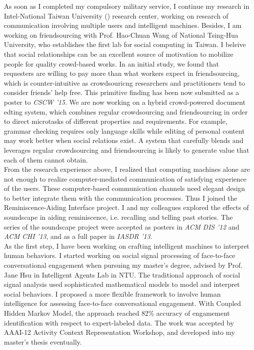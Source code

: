 \noindent
As soon as I completed my compulsory military service, 
I continue my research in Intel-National Taiwan University () research center, 
working on research of communication involving multiple users and intelligent machines. 
Besides, I am working on friendsourcing with Prof. Hao-Chuan Wang of National Tsing-Hua University, 
who establishes the first lab for social computing in Taiwan. 
I beleive that social relationships can be an excellent source of motivation to mobilize people for quality crowd-based works. 
In an initial study, we found that requesters are willing to pay more than what workers expect in friendsourcing, 
which is counter-intuitive as crowdsouricng researchers and practitioners tend to consider friends' help free. 
This primitive finding has been now submitted as a poster to \emph{CSCW '15}. 
We are now working on a hybrid crowd-powered document edting system, 
which combines regular crowdsourcing and friendsourcing in order to direct microtasks of different properties and requirements. 
For example, grammar checking requires only language skills while editing of personal content may work better when social relations exist. 
A system that carefully blends and leverages regular crowdsourcing and friendsourcing is likely to generate value that each of them cannot obtain.\\

\noindent
From the research experience above, 
I realized that computing machines alone are not enough to realize computer-mediated communication of satisfying experience of the users. 
These computer-based communication channels need elegant design to better integrate them with the communication processes. 
Thus I joined the Reminiscence-Aiding Interface project.
I and my colleagues explored the effects of soundscape in aiding reminiscence, i.e. recalling and telling past stories. 
The series of the soundscape project were accepted as posters in \emph{ACM DIS '12} and \emph{ACM CHI '13}, and as a full paper in \emph{IASDR '13}.\\


\noindent
As the first step, 
I have been working on crafting intelligent machines to interpret human behaviors. 
I started working on social signal processing of face-to-face conversational engagement when pursuing my master's degree, 
advised by Prof. Jane Hsu in Intelligent Agents Lab in NTU. 
The traditional approach of social signal analysis used sophisticated mathematical models to model and interpret social behaviors. 
I proposed a more flexible framework to involve human intelligence for assessing face-to-face conversational engagement. 
With Coupled Hidden Markov Model, the approach reached 82\% accuracy of engamement identification with respect to expert-labeled data. 
The work was accepted by AAAI-12 Activity Context Representation Workshop, and developed into my master’s thesis eventually.\\

